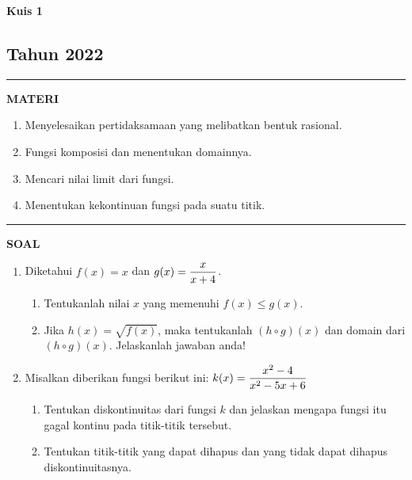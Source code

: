 \begin{flushright}
    \textbf{\Large{Kuis 1}}
    \subsection*{Tahun 2022}
\end{flushright}


\vspace{0.5cm}\hrule height 2pt\vspace{0.5cm}


\begin{center}
\textbf{\large{MATERI}}
\begin{enumerate}[leftmargin=*, label={\arabic*}.]
\item Menyelesaikan pertidaksamaan yang melibatkan bentuk rasional.
\item Fungsi komposisi dan menentukan domainnya.
\item Mencari nilai limit dari fungsi.
\item Menentukan kekontinuan fungsi pada suatu titik.
\end{enumerate}
\end{center}


\vspace{0.2cm}\hrule height 1pt\vspace{0.5cm}


\begin{center}
\textbf{\large{SOAL}}
\end{center}
\begin{enumerate}[leftmargin=*, label={\arabic*}.]
\item Diketahui $f(x) = x$ dan $\displaystyle g(x) = \frac{x}{x+4}$.
    \begin{enumerate}[label={\alph*}.]
    \item Tentukanlah nilai $x$ yang memenuhi $f(x) \leq g(x)$.
    \item Jika $h(x) = \sqrt{f(x)}$, maka tentukanlah $(h \circ g)(x)$ 
    dan domain dari $(h \circ g)(x)$. Jelaskanlah jawaban anda!
    \end{enumerate}
\item Misalkan diberikan fungsi berikut ini: 
$\displaystyle k(x) = \frac{x^{2}-4}{x^{2}-5x+6}$
    \begin{enumerate}[label={\alph*}.]
    \item Tentukan diskontinuitas dari fungsi $k$ dan jelaskan mengapa fungsi
    itu gagal kontinu pada titik-titik tersebut.
    \item Tentukan titik-titik yang dapat dihapus dan yang tidak dapat dihapus
    diskontinuitasnya.
    \end{enumerate}
\end{enumerate}


